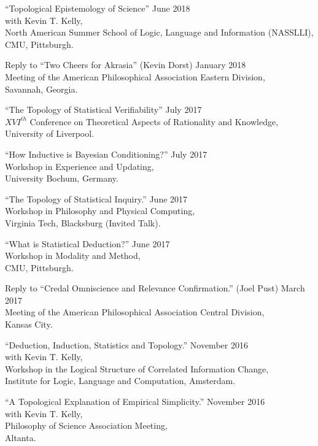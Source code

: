 \documentclass[12pt]{res} %
\begin{document}
\begin{resume}
``Topological Epistemology of Science'' \hfill June 2018\\
with Kevin T. Kelly,\\
North American Summer School of Logic, Language and Information (NASSLLI),\\
CMU, Pittsburgh.

Reply to ``Two Cheers for Akrasia'' (Kevin Dorst) \hfill January 2018\\
Meeting of the American Philosophical Association Eastern Division,\\ 
Savannah, Georgia.

``The Topology of Statistical Verifiability'' \hfill July 2017\\
$XVI^{th}$ Conference on Theoretical Aspects of Rationality and Knowledge,\\
University of Liverpool. 

``How Inductive is Bayesian Conditioning?'' \hfill July 2017\\
Workshop in Experience and Updating,\\
University Bochum, Germany.

``The Topology of Statistical Inquiry.'' \hfill June 2017\\
Workshop in Philosophy and Physical Computing, \\
Virginia Tech, Blacksburg (Invited Talk).

``What is Statistical Deduction?'' \hfill June 2017\\
Workshop in Modality and Method, \\
CMU, Pittsburgh.

Reply to ``Credal Omniscience and Relevance Confirmation.'' (Joel Pust) \hfill March 2017\\
Meeting of the American Philosophical Association Central Division,\\ 
Kansas City.

``Deduction, Induction, Statistics and Topology.'' \hfill November 2016\\
with Kevin T. Kelly,\\
 Workshop in the Logical Structure of Correlated Information Change,\\ Institute for Logic, Language and Computation, Amsterdam.

``A Topological Explanation of Empirical Simplicity.'' \hfill November 2016\\
with Kevin T. Kelly,\\
Philosophy of Science Association Meeting, \\
Altanta.


\end{resume}
\end{document}
